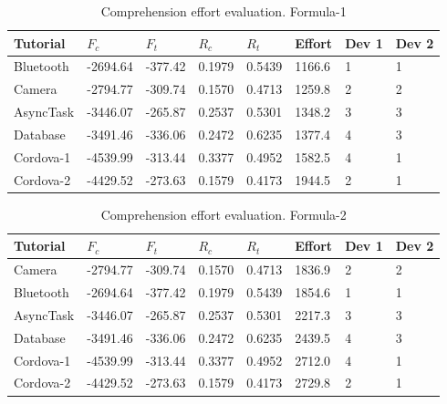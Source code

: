 \documentclass[12pt,mscthesis]{usiinfthesis}
\begin{document}
{\begin {table}[H]
	\begin{center}
    \begin{tabular}{| l | l | l | l | l | l | l | l |}
    \hline
\textbf{Tutorial}	&  \textbf{$F_{c}$}	& \textbf{$F_{t}$}	& \textbf{$R_c$}	& \textbf{$R_t$}	& \textbf{Effort}	& \textbf{ Dev 1}&  \textbf{Dev 2}\\ \hline
Bluetooth   & -2694.64	& -377.42	& 0.1979 	& 0.5439	& 1166.6	& 1	& 1\\ \hline
Camera		& -2794.77	& -309.74	& 0.1570	& 0.4713	& 1259.8	& 2	& 2\\ \hline
AsyncTask	& -3446.07	& -265.87	& 0.2537	& 0.5301	& 1348.2	& 3	& 3\\ \hline
Database	& -3491.46	& -336.06	& 0.2472	& 0.6235	& 1377.4	& 4	& 3\\ \hline
Cordova-1	& -4539.99	& -313.44	& 0.3377	& 0.4952	& 1582.5	& 4	& 1\\ \hline
Cordova-2	& -4429.52	& -273.63	& 0.1579	& 0.4173	& 1944.5	& 2	& 1\\ \hline
   \end{tabular}
	\end{center}
	\caption{Comprehension effort evaluation. Formula-1} 
	\label{tab:comprehension-effort-1} 
	\end{table}


\begin {table}[H]
	\begin{center}
    \begin{tabular}{| l | l | l | l | l | l | l | l |}
    \hline
\textbf{Tutorial}	&  \textbf{$F_{c}$}	& \textbf{$F_{t}$}	& \textbf{$R_c$}	& \textbf{$R_t$}	& \textbf{Effort}	& \textbf{ Dev 1}&  \textbf{Dev 2}\\ \hline
Camera		& -2794.77	& -309.74	& 0.1570	& 0.4713	& 1836.9	& 2	& 2\\ \hline
Bluetooth   & -2694.64	& -377.42	& 0.1979 	& 0.5439	& 1854.6	& 1	& 1\\ \hline
AsyncTask	& -3446.07	& -265.87	& 0.2537	& 0.5301	& 2217.3	& 3	& 3\\ \hline
Database	& -3491.46	& -336.06	& 0.2472	& 0.6235	& 2439.5	& 4	& 3\\ \hline
Cordova-1	& -4539.99	& -313.44	& 0.3377	& 0.4952	& 2712.0	& 4	& 1\\ \hline
Cordova-2	& -4429.52	& -273.63	& 0.1579	& 0.4173	& 2729.8	& 2	& 1\\ \hline
   \end{tabular}
	\end{center}
	\caption{Comprehension effort evaluation. Formula-2} \label{tab:comprehension-effort-2} 
	\end{table}


}
\end{document}
